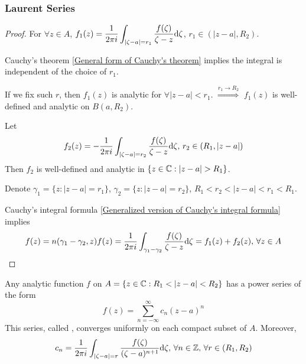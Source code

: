 \subsubsection{Laurent Series}
\begin{proof}
    For  $ \forall z\in A  $,  $ f_1(z)=\displaystyle\frac{1}{2\pi i}\int_{|\zeta-a|=r_1}\frac{f(\zeta)}{\zeta-z}\mathrm{d} \zeta $,  $ r_1\in (|z-a|,R_2) $.  

    Cauchy's theorem \ref{General form of Cauchy's theorem} implies the integral is independent of the choice of  $ r_1$. 

    If we fix such  $ r  $, then  $ f_1(z)  $ is analytic for  $ \forall |z-a|<r_1 $.  $ \overset{r_1\to R_2}{\Rightarrow}  $ $ f_1(z)  $ is well-defined and   analytic on  $ B(a,R_2) $.

    Let  
    \begin{equation}
        f_2(z)=-\displaystyle\frac{1 }{2\pi i}\int_{|\zeta-a|=r_2}\frac{f(\zeta)}{\zeta-z}\mathrm{d}\zeta,\,r_2\in(R_1,|z-a|)\label{eq:5.1.2:f_2 in lemma}
    \end{equation}
    Then  $ f_2  $ is well-defined and analytic in  $ \{z\in\Cbb:|z-a|>R_1\} $.  

    Denote $ \gamma_1=\{z:|z-a|=r_1\} $,  $ \gamma_2=\{z:|z-a|=r_2\} $,  $ R_1<r_2<|z-a|<r_1<R_1 $.
    
    Cauchy's integral formula \ref{Generalized version of Cauchy's integral formula} implies  
    \begin{equation}
        f(z)=n(\gamma_1-\gamma_2,z)f(z)=\displaystyle\frac{1}{2\pi i}\int_{\gamma_1-\gamma_2}\frac{f(\zeta)}{\zeta-z}\mathrm{d} \zeta=f_1(z)+f_2(z),
        \,\forall z\in A
    \end{equation}
\end{proof}
\begin{theorem}\label{thm:5.1.3:Laurent Theorem}
    Any analytic function  $ f  $ on  $ A=\{z\in \Cbb:R_1<|z-a|<R_2\} $ has a power series of the form 
    \begin{equation}
        f(z)=\sum_{n=-\infty}^\infty c_n(z-a)^n\label{eq:5.1.3:Laurent Series}
    \end{equation} 
    This series, called , converges uniformly on each compact subset of  $ A  $. Moreover, 
    \begin{equation}
        c_n=\frac{1 }{2\pi i}\int_{|\zeta-a|=r}\frac{f(\zeta)}{(\zeta-a)^{n+1}}\mathrm{d}\zeta,\,\forall n\in \mathbb Z,\,\forall r\in (R_1,R_2)
    \end{equation}
\end{theorem}
